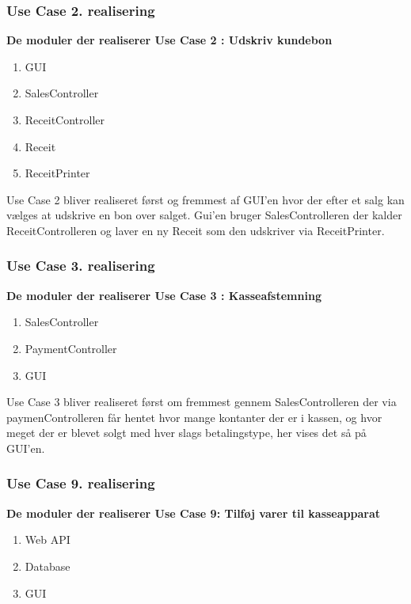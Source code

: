 \subsubsection{ Use Case 2. realisering	}
\textbf{De moduler der realiserer Use Case 2 : Udskriv kundebon}

\begin{enumerate}
	\item GUI
	\item SalesController
	\item ReceitController
	\item Receit
	\item ReceitPrinter
\end{enumerate}

Use Case 2 bliver realiseret først og fremmest af GUI'en hvor der efter et salg kan vælges at udskrive en bon over salget. Gui'en bruger SalesControlleren der kalder ReceitControlleren og laver en ny Receit som den udskriver via ReceitPrinter. 

\subsubsection{ Use Case 3. realisering}
\textbf{De moduler der realiserer Use Case 3 : Kasseafstemning}

\begin{enumerate}
	\item SalesController
	\item PaymentController
	\item GUI
\end{enumerate}

Use Case 3 bliver realiseret først om fremmest gennem SalesControlleren der via paymenControlleren får hentet hvor mange kontanter der er i kassen, og hvor meget der er blevet solgt med hver slags betalingstype, her vises det så på GUI'en. 


\subsubsection{Use Case 9. realisering}
\textbf{De moduler der realiserer Use Case 9: Tilføj varer til kasseapparat}

\begin{enumerate}
	\item Web API
	\item Database
	\item GUI
\end{enumerate}

